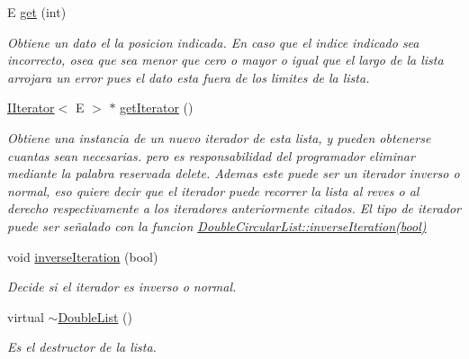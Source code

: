 \begin{DoxyCompactItemize}
E \hyperlink{class_double_list_a230a8c9c574abe9c72f8daae35127d9c}{get} (int)
\begin{DoxyCompactList}\small\item\em Obtiene un dato el la posicion indicada. En caso que el indice indicado sea incorrecto, osea que sea menor que cero o mayor o igual que el largo de la lista arrojara un error pues el dato esta fuera de los limites de la lista. \end{DoxyCompactList}\item 
\hyperlink{class_i_iterator}{I\-Iterator}$<$ E $>$ $\ast$ \hyperlink{class_double_list_aa14e383a97e054016a6c5178165b20df}{get\-Iterator} ()
\begin{DoxyCompactList}\small\item\em Obtiene una instancia de un nuevo iterador de esta lista, y pueden obtenerse cuantas sean necesarias. pero es responsabilidad del programador eliminar mediante la palabra reservada delete. Ademas este puede ser un iterador inverso o normal, eso quiere decir que el iterador puede recorrer la lista al reves o al derecho respectivamente a los iteradores anteriormente citados. El tipo de iterador puede ser señalado con la funcion \hyperlink{class_double_circular_list_a77212c5d6ad148c99a06009a8c44128b}{Double\-Circular\-List\-::inverse\-Iteration(bool)}\end{DoxyCompactList}\item 
void \hyperlink{class_double_list_a94d1ad5299452ea46839ba350ca501d1}{inverse\-Iteration} (bool)
\begin{DoxyCompactList}\small\item\em Decide si el iterador es inverso o normal. \end{DoxyCompactList}\item 
\hypertarget{class_double_list_a11ce233388fea7a5722a7d57cea400a3}{virtual \hyperlink{class_double_list_a11ce233388fea7a5722a7d57cea400a3}{$\sim$\-Double\-List} ()}\label{class_double_list_a11ce233388fea7a5722a7d57cea400a3}

\begin{DoxyCompactList}\small\item\em Es el destructor de la lista. \end{DoxyCompactList}\end{DoxyCompactItemize}
